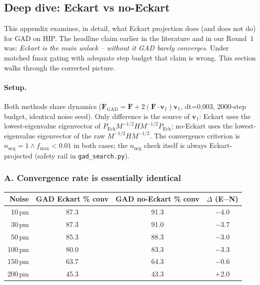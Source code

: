 \documentclass[11pt]{article}
\begin{document}
\clearpage
\subsection{Deep dive: Eckart vs no-Eckart}
\label{sec:eckart_appendix}

This appendix examines, in detail, what Eckart projection does (and
does not do) for GAD on HIP. The headline claim earlier in the
literature and in our Round~1 was: \emph{Eckart is the main unlock --
without it GAD barely converges}. Under matched fmax gating with
adequate step budget that claim is wrong. This section walks through
the corrected picture.

\paragraph{Setup.} Both methods share dynamics
($\mathbf{F}_{\text{GAD}} = \mathbf{F} + 2(\mathbf{F}\cdot\mathbf{v}_1)\mathbf{v}_1$,
dt=0.003, 2000-step budget, identical noise seed). Only difference is the source
of $\mathbf{v}_1$: Eckart uses the lowest-eigenvalue eigenvector of
$P_{\text{Eck}} M^{-1/2} H M^{-1/2} P_{\text{Eck}}$; no-Eckart uses the
lowest-eigenvalue eigenvector of the raw $M^{-1/2} H M^{-1/2}$.
The convergence criterion is $n_{\text{neg}}{=}1 \wedge f_{\max}{<}0.01$
in both cases; the $n_{\text{neg}}$ check itself is always Eckart-projected
(safety rail in \texttt{gad\_search.py}).

\subsubsection*{A. Convergence rate is essentially identical}

\begin{center}
\begin{tabular}{r|cc|c}
\toprule
Noise & GAD Eckart \% conv & GAD no-Eckart \% conv & $\Delta$ (E$-$N) \\
\midrule
10\,pm  & 87.3 & 91.3 & $-4.0$ \\
30\,pm  & 87.3 & 91.0 & $-3.7$ \\
50\,pm  & 85.3 & 88.3 & $-3.0$ \\
100\,pm & 80.0 & 83.3 & $-3.3$ \\
150\,pm & 63.7 & 64.3 & $-0.6$ \\
200\,pm & 45.3 & 43.3 & $+2.0$ \\
\bottomrule
\end{tabular}
\end{center}
\end{document}
